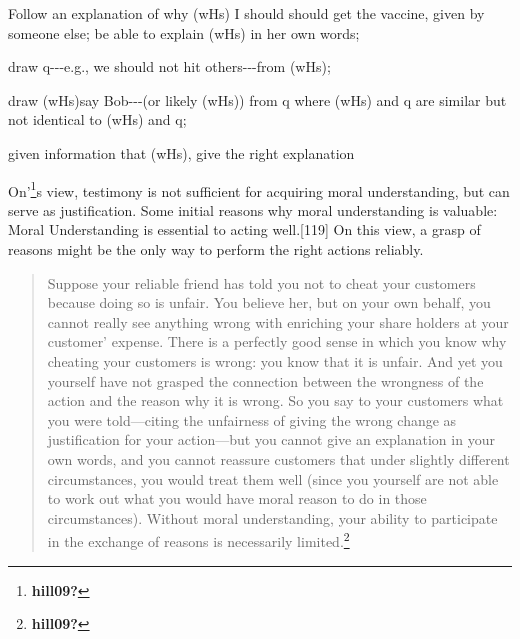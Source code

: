 \documentclass[
  12pt,
]{book}
\newenvironment{Shaded}{\begin{snugshade}}{\end{snugshade}}
\newcommand{\NormalTok}[1]{#1}
\theoremstyle{definition}
\theoremstyle{definition}
\theoremstyle{definition}
\theoremstyle{definition}
\theoremstyle{remark}
\begin{document}
\begin{Shaded}
\begin{Highlighting}[]

\NormalTok{Follow an explanation of why (wHs) \textquotesingle{}I should should get the vaccine,\textquotesingle{} given by someone else; be able to explain (wHs) in her own words;}
\end{Highlighting}
\end{Shaded}

\begin{Shaded}
\begin{Highlighting}[]

\NormalTok{draw q{-}{-}{-}e.g., we should not hit others{-}{-}{-}from (wHs);}
\end{Highlighting}
\end{Shaded}

\begin{Shaded}
\begin{Highlighting}[]

\NormalTok{draw (wHs)\textquotesingle{}{-}{-}{-}say Bob{-}{-}{-}(or likely (wHs)\textquotesingle{}) from q\textquotesingle{} where (wHs)\textquotesingle{} and q\textquotesingle{} are similar but not identical to (wHs) and q;}
\end{Highlighting}
\end{Shaded}

\begin{Shaded}
\begin{Highlighting}[]

\NormalTok{given information that (wHs), give the right explanation}
\end{Highlighting}
\end{Shaded}

On'\footnote{\textbf{hill09?}}s view, testimony is not sufficient for acquiring moral understanding, but can serve as justification. Some initial reasons why moral understanding is valuable: Moral Understanding is essential to acting well.{[}119{]} On this view, a grasp of reasons might be the only way to perform the right actions reliably.

\begin{quote}
Suppose your reliable friend has told you not to cheat your customers because doing so is unfair. You believe her, but on your own behalf, you cannot really see anything wrong with enriching your share holders at your customer' expense. There is a perfectly good sense in which you know why cheating your customers is wrong: you know that it is unfair. And yet you yourself have not grasped the connection between the wrongness of the action and the reason why it is wrong. So you say to your customers what you were told---citing the unfairness of giving the wrong change as justification for your action---but you cannot give an explanation in your own words, and you cannot reassure customers that under slightly different circumstances, you would treat them well (since you yourself are not able to work out what you would have moral reason to do in those circumstances). Without moral understanding, your ability to participate in the exchange of reasons is necessarily limited.\footnote{\textbf{hill09?}}
\end{quote}
\end{document}
